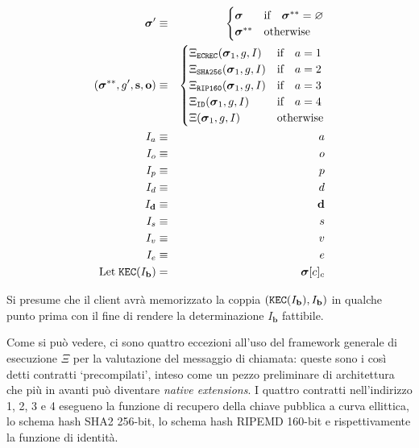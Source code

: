 \documentclass[9pt,oneside]{amsart}
\begin{document}
\begin{multicols}{2}
\begin{eqnarray}
\boldsymbol{\sigma}' & \equiv & \begin{cases}
\boldsymbol{\sigma} & \text{if} \quad \boldsymbol{\sigma}^{**} = \varnothing \\
\boldsymbol{\sigma}^{**} & \text{otherwise}
\end{cases} \\
(\boldsymbol{\sigma}^{**}, g', \mathbf{s}, \mathbf{o}) & \equiv & \begin{cases}
\Xi_{\mathtt{ECREC}}(\boldsymbol{\sigma}_1, g, I) & \text{if} \quad a = 1 \\
\Xi_{\mathtt{SHA256}}(\boldsymbol{\sigma}_1, g, I) & \text{if} \quad a = 2 \\
\Xi_{\mathtt{RIP160}}(\boldsymbol{\sigma}_1, g, I) & \text{if} \quad a = 3 \\
\Xi_{\mathtt{ID}}(\boldsymbol{\sigma}_1, g, I) & \text{if} \quad a = 4 \\
\Xi(\boldsymbol{\sigma}_1, g, I) & \text{otherwise} \end{cases} \\
I_a & \equiv & a \\
I_o & \equiv & o \\
I_p & \equiv & p \\
I_d & \equiv & d \\
I_\mathbf{d} & \equiv & \mathbf{d} \\
I_s & \equiv & s \\
I_v & \equiv & v \\
I_e & \equiv & e \\
\text{Let} \; \mathtt{\tiny KEC}(I_\mathbf{b}) & = & \boldsymbol{\sigma}[c]_c
\end{eqnarray}

Si presume che il client avrà memorizzato la coppia $(\mathtt{\tiny KEC}(I_\mathbf{b}), I_\mathbf{b})$ in qualche punto prima con il fine di rendere la determinazione $I_\mathbf{b}$ fattibile.

Come si può vedere, ci sono quattro eccezioni all'uso del framework generale di esecuzione $\Xi$ per la valutazione del messaggio di chiamata: queste sono i così detti contratti `precompilati', inteso come un pezzo preliminare di architettura che più in avanti può diventare \textit{native extensions}. I quattro contratti nell'indirizzo 1, 2, 3 e 4 esegueno la funzione di recupero della chiave pubblica a curva ellittica, lo schema hash SHA2 256-bit, lo schema hash RIPEMD 160-bit e rispettivamente la funzione di identità.


\end{multicols}
\end{document}
